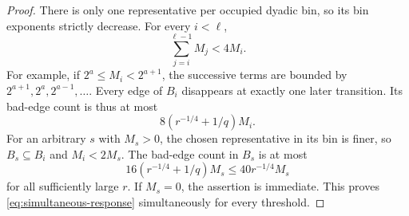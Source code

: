 \documentclass[11pt]{amsart}
\theoremstyle{definition}
\theoremstyle{remark}
\numberwithin{equation}{section}
\begin{document}
\begin{proof}
There is only one representative per occupied dyadic bin, so its
bin exponents strictly decrease. For every \(i<\ell\),
\begin{equation}\label{eq:dyadic-tail}
 \sum_{j=i}^{\ell-1}M_j<4M_i.
\end{equation}
For example, if \(2^a\le M_i<2^{a+1}\), the successive terms are
bounded by \(2^{a+1},2^a,2^{a-1},\ldots\).
Every edge of \(B_i\) disappears at exactly one later transition.
Its bad-edge count is thus at most
\[
 8(r^{-1/4}+1/q)M_i.
\]
For an arbitrary \(s\) with \(M_s>0\), the chosen representative
in its bin is finer, so \(B_s\subseteq B_i\) and \(M_i<2M_s\).
The bad-edge count in \(B_s\) is at most
\[
 16(r^{-1/4}+1/q)M_s\le40r^{-1/4}M_s
\]
for all sufficiently large \(r\). If \(M_s=0\), the assertion is
immediate. This proves \eqref{eq:simultaneous-response}
simultaneously for every threshold.
\end{proof}
\end{document}
